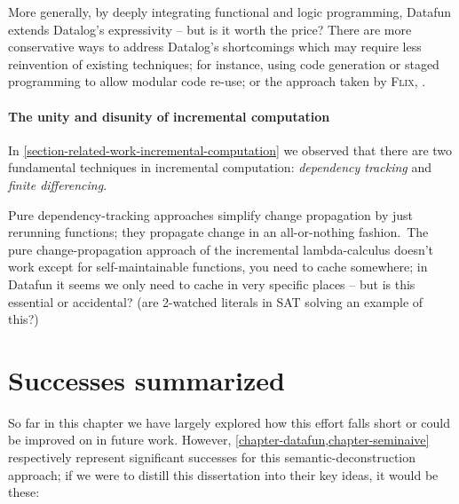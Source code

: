 More generally, by deeply integrating functional and logic programming, Datafun
extends Datalog's expressivity -- but is it worth the price? There are more
conservative ways to address Datalog's shortcomings which may require less
reinvention of existing techniques; for instance, using code generation or staged programming to allow modular code re-use; or the approach taken by \textsc{Flix}, \XXX.


\paragraph{The unity and disunity of incremental computation}


In \cref{section-related-work-incremental-computation} we observed that there are two fundamental techniques in incremental computation: \emph{dependency tracking} and \emph{finite differencing}. \XXX

Pure dependency-tracking approaches simplify change propagation by just rerunning functions; they propagate change in an all-or-nothing fashion.\footnotemark\ The pure change-propagation approach of the incremental lambda-calculus doesn't work except for self-maintainable functions, you need to cache somewhere; in Datafun it seems we only need to cache in very specific places -- but is this essential or accidental? (are 2-watched literals in SAT solving an example of this?)




\section{Successes summarized}

So far in this chapter we have largely explored how this effort falls short or could be improved on in future work.
%
However, \cref{chapter-datafun,chapter-seminaive} respectively represent
significant successes for this semantic-deconstruction approach; if we were to
distill this dissertation into their key ideas, it would be these:


